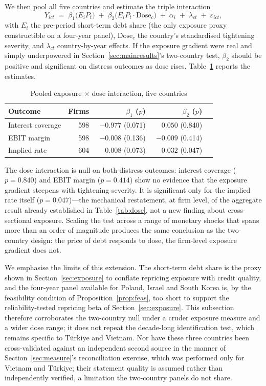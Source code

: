 \documentclass[review,12pt,authoryear]{elsarticle}
\theoremstyle{plain}
\theoremstyle{definition}
\begin{document}
We then pool all five countries and estimate the triple interaction
\begin{equation}
Y_{ict} \;=\; \beta_1\bigl(E_i P_t\bigr) \;+\;
\beta_2\bigl(E_i P_t \cdot \mathrm{Dose}_c\bigr) \;+\;
\alpha_i \;+\; \lambda_{ct} \;+\; \varepsilon_{ict},
\label{eq:tripledose}
\end{equation}
with $E_i$ the pre-period short-term debt share (the only exposure proxy
constructible on a four-year panel), $\mathrm{Dose}_c$ the country's
standardised tightening severity, and $\lambda_{ct}$ country-by-year effects.
If the exposure gradient were real and simply underpowered in
Section~\ref{sec:mainresults}'s two-country test, $\beta_2$ should be positive and
significant on distress outcomes as dose rises. Table~\ref{tab:dosegrad}
reports the estimates.

\begin{table}[htbp]
\centering
\caption{Pooled exposure $\times$ dose interaction, five countries}
\label{tab:dosegrad}
\begin{tabular}{lrrrr}
\toprule
Outcome & Firms & $\beta_1$ ($p$) & $\beta_2$ ($p$) \\
\midrule
Interest coverage  & 598 & $-0.977$ (0.071) & $\phantom{-}0.050$ (0.840) \\
EBIT margin        & 598 & $-0.008$ (0.136) & $-0.009$ (0.414) \\
Implied rate       & 604 & $\phantom{-}0.008$ (0.073) & $\phantom{-}0.032$ (0.047) \\
\bottomrule
\end{tabular}
\end{table}

The dose interaction is null on both distress outcomes: interest coverage
($p=0.840$) and EBIT margin ($p=0.414$) show no evidence that the exposure
gradient steepens with tightening severity. It is significant only for the
implied rate itself ($p=0.047$)---the mechanical restatement, at firm level,
of the aggregate result already established in Table~\ref{tab:dose}, not a new
finding about cross-sectional exposure. Scaling the test across a range of
monetary shocks that spans more than an order of magnitude produces the same
conclusion as the two-country design: the price of debt responds to dose, the
firm-level exposure gradient does not.

We emphasise the limits of this extension. The short-term debt share is the
proxy shown in Section~\ref{sec:exposure} to conflate repricing exposure with
credit quality, and the four-year panel available for Poland, Israel and
South Korea is, by the feasibility condition of Proposition~\ref{prop:feas},
too short to support the reliability-tested repricing beta of
Section~\ref{sec:exposure}. This subsection therefore corroborates the
two-country null under a cruder exposure measure and a wider dose range; it
does not repeat the decade-long identification test, which remains specific
to T\"{u}rkiye and Vietnam. Nor have these three countries been
cross-validated against an independent second source in the manner of
Section~\ref{sec:measure}'s reconciliation exercise, which was performed only
for Vietnam and T\"{u}rkiye; their statement quality is assumed rather than
independently verified, a limitation the two-country panels do not share.
\end{document}
